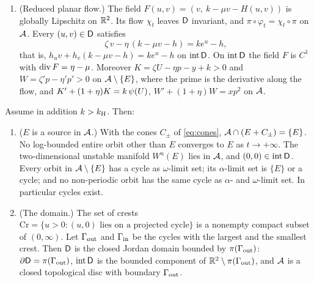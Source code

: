 \begin{theorem}
\begin{enumerate}[label=\textup{(A\arabic*)}]
\[\]
is convex and globally Lipschitz on $\R^2$, and $\cA=\{(u,v,h(u,v)):(u,v)\in\Dsc\}$ with $h=H|_{\Dsc}$. The map $g=(\zeta,-\eta)\circ(\pi|_\cA)^{-1}:\Dsc\to\R^2$ is continuous and, for all $q,q'\in\Dsc$,
\begin{equation}\label{att:eq:whitney}
0\le h(q')-h(q)-g(q)\cdot(q'-q)\le\bigl(g(q')-g(q)\bigr)\cdot(q'-q).
\end{equation}
Consequently $h$ is differentiable at every interior point of $\Dsc$, $h\in C^1(\inter\Dsc)$,
\[
\nabla h=(\zeta,-\eta),\qquad h_u=\zeta>0,\qquad h_v=-\eta<-\max(0,\mu-1)\qquad\text{on }\inter\Dsc,
\]
and $(h,g)$ satisfies the hypothesis of \textup{(I5)} on $\Dsc$. The set $\Dsc$ is not claimed to be convex: the graph is convex in the sense that $h$ is the restriction of the convex function $H$.
\item \textup{(Reduced planar flow.)} The field $F(u,v)=(v,\ k-\mu v-H(u,v))$ is globally Lipschitz on $\R^2$. Its flow $\chi_t$ leaves $\Dsc$ invariant, and $\pi\circ\varphi_t=\chi_t\circ\pi$ on $\mathcal A$. Every $(u,v)\in\mathsf D$ satisfies
\begin{equation}\label{att:eq:pde}
\zeta\,v-\eta\,(k-\mu v-h)=ke^{u}-h ,
\end{equation}
that is, $h_uv+h_v(k-\mu v-h)=ke^{u}-h$ on $\operatorname{int}\mathsf D$. On $\operatorname{int}\mathsf D$ the field $F$ is $C^1$ with $\operatorname{div} F=\eta-\mu$. Moreover $K=\zeta U-\eta p-y+k>0$ and $W=\zeta'p-\eta'p'>0$ on $\mathcal A\setminus\{E\}$, where the prime is the derivative along the flow, and $K'+(1+\eta)K=k\,\psi(U)$, $W'+(1+\eta)W=xp^2$ on $\mathcal A$.
\end{enumerate}
Assume in addition $k>k_{\mathrm H}$. Then:
\begin{enumerate}[label=\textup{(A\arabic*)},resume]
\item \textup{($E$ is a source in $\mathcal A$.)} With the cones $C_\pm$ of \eqref{eq:cones}, $\mathcal A\cap(E+C_\pm)=\{E\}$. No log-bounded entire orbit other than $E$ converges to $E$ as $t\to+\infty$. The two-dimensional unstable manifold $W^u(E)$ lies in $\mathcal A$, and $(0,0)\in\operatorname{int}\mathsf D$. Every orbit in $\mathcal A\setminus\{E\}$ has a cycle as $\omega$-limit set; its $\alpha$-limit set is $\{E\}$ or a cycle; and no non-periodic orbit has the same cycle as $\alpha$- and $\omega$-limit set. In particular cycles exist.
\item \textup{(The domain.)} The set of crests $\mathrm{Cr}=\{u>0:(u,0)\text{ lies on a projected cycle}\}$ is a nonempty compact subset of $(0,\infty)$. Let $\Gamma_{\rm out}$ and $\Gamma_{\rm in}$ be the cycles with the largest and the smallest crest. Then $\Dsc$ is the closed Jordan domain bounded by $\pi(\Gamma_{\rm out})$: $\partial\mathsf D=\pi(\Gamma_{\rm out})$, $\operatorname{int}\mathsf D$ is the bounded component of $\mathbb R^2\setminus\pi(\Gamma_{\rm out})$, and $\mathcal A$ is a closed topological disc with boundary $\Gamma_{\rm out}$.

\end{enumerate}
\end{theorem}
